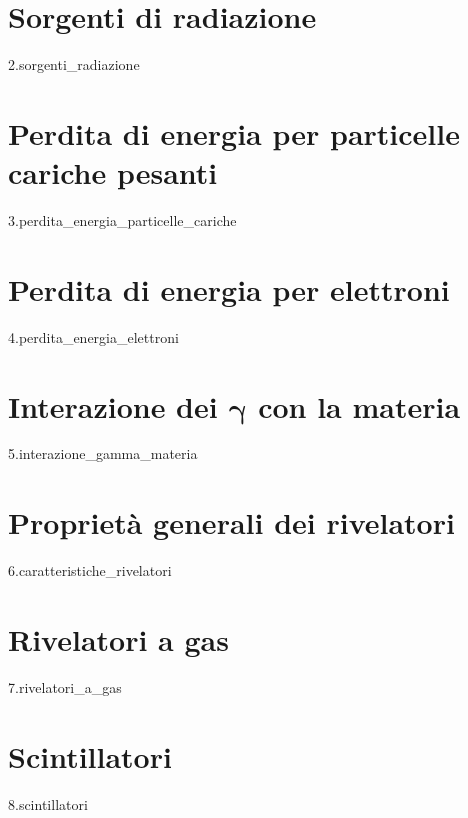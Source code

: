 \documentclass[12pt]{book}
\begin{document}
\chapter{Sorgenti di radiazione}
{2.sorgenti_radiazione}

\chapter{Perdita di energia per particelle cariche pesanti}
{3.perdita_energia_particelle_cariche}

\chapter{Perdita di energia per elettroni}
{4.perdita_energia_elettroni}

\chapter[Interazione dei \texorpdfstring{$\gamma$}{\textgamma} con la materia]
{Interazione dei $\boldsymbol{\gamma}$ con la materia}
{5.interazione_gamma_materia}

\chapter{Proprietà generali dei rivelatori}\label{chap:caratteristiche_rivelatori}
{6.caratteristiche_rivelatori}

\chapter{Rivelatori a gas}
{7.rivelatori_a_gas}

\chapter{Scintillatori}
{8.scintillatori}
\end{document}
